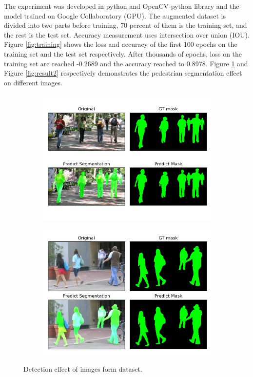 \documentclass[12pt, a4paper]{article}
\begin{document}
\begin{multicols}{2}
	The experiment was developed in python and OpenCV-python library and the model trained on Google Collaboratory (GPU). The augmented dataset is divided into two parts before training, 70 percent of them is the training set, and the rest is the test set. Accuracy measurement uses intersection over union (IOU). Figure \ref{fig:training} shows the loss and accuracy of the first 100 epochs on the training set and the test set respectively. After thousands of epochs, loss on the training set are reached -0.2689 and the accuracy reached to 0.8978. Figure \ref{fig:result1} and Figure \ref{fig:result2} respectively demonstrates the pedestrian segmentation effect on different images.
	\begin{figure}[h!]
	  \centering
	  \begin{subfigure}[b]{0.45\linewidth}
	    \includegraphics[width=\linewidth]{predictMask1.png}
	  \end{subfigure}
	  \begin{subfigure}[b]{0.45\linewidth}
	    \includegraphics[width=\linewidth]{predictMask2.png}
	  \end{subfigure}
	  \caption{Detection effect of images form dataset.}
	  \label{fig:result1}
	\end{figure}


\end{multicols}
\end{document}

